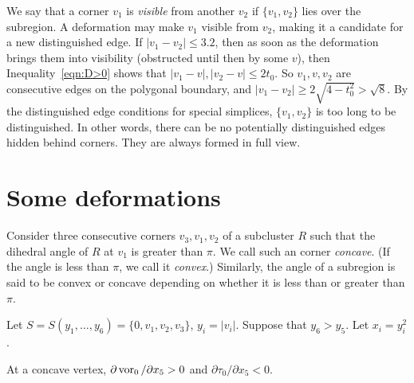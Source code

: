 We say that a corner $v_1$ is {\it visible} from another $v_2$ if
$\{v_1,v_2\}$ lies over the subregion.  A deformation may make $v_1$
visible from $v_2$, making it a candidate for a new distinguished edge.
If $|v_1-v_2|\le 3.2$, then as soon as the deformation brings them into
visibility (obstructed until then by some $v$), then
Inequality~\ref{eqn:D>0} shows that $|v_1-v|,|v_2-v|\le2t_0$. So
$v_1,v,v_2$ are consecutive edges on the polygonal boundary, and
$|v_1-v_2|\ge 2\sqrt{4-t_0^2} > \sqrt{8}$. By the distinguished edge
conditions for special simplices, $\{v_1,v_2\}$ is too long to be
distinguished.  In other words, there can be no potentially
distinguished edges hidden behind corners. They are always formed in
full view.

\section{Some deformations}

\begin{definition}\label{def:concave}
Consider three consecutive corners $v_3,v_1,v_2$ of a subcluster
$R$ such that the dihedral angle of $R$ at $v_1$ is greater than
$\pi$.  We call such an corner {\it concave}.  (If the angle is
less than $\pi$, we call it {\it convex}.)  Similarly, the angle
of a subregion is said to be convex or concave depending on
whether it is less than or greater than $\pi$.
\end{definition}

Let
    $S=S(y_1,\ldots,y_6)=\{0,v_1,v_2,v_3\}$, $y_i=|v_i|$.
Suppose that $y_6>y_5$.  Let $x_i=y_i^2$.

\begin{lemma}
At a concave vertex, $\partial \operatorname{vor}_0/\partial x_5 >0$ and
    $\partial \tau_0/\partial x_5<0$.
\end{lemma}

